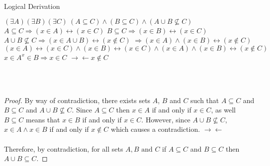 \documentclass[12pt]{article}
\newcommand{\contradiction}{$\rightarrow\leftarrow$}
\begin{document}
    Logical Derivation
                \begin{outline}
                    \1 $(\exists A)(\exists B)(\exists C)\ (A\subseteq C)\wedge (B\subseteq C)\wedge (A\cup B \not\subseteq C)$
                        \2 $A\subseteq C\Rightarrow (x\in A)\leftrightarrow(x\in C)$
                        \2 $B\subseteq C\Rightarrow (x\in B)\leftrightarrow(x\in C)$
                        \2 $A\cup B \not\subseteq C\Rightarrow (x\in A\cup B)\leftrightarrow(x\notin C)$
                            \3 $\Rightarrow (x\in A)\wedge (x\in B)\leftrightarrow(x\notin C)$
                    \1 $(x\in A)\leftrightarrow(x\in C) \wedge (x\in B)\leftrightarrow(x\in C) \wedge (x\in A)\wedge (x\in B)\leftrightarrow(x\notin C)$
                    \1 $x\in A ^ x\in B \Rightarrow x\in C$ \contradiction $x\notin C$
                \end{outline}
                \\\\
                \begin{proof}
                    By way of contradiction, there exists sets $A$, $B$ and $C$ such that $A\subseteq C$ and $B\subseteq C$ and $A\cup B \not\subseteq C$.
                    Since $A\subseteq C$ then $x\in A$ if and only if $x\in C$, as well $B\subseteq C$ means that $x\in B$ if and only if $x\in C$.
                    However, since $A\cup B\not\subseteq C$, $x\in A \wedge x\in B$ if and only if $x\notin C$ which causes a contradiction. \contradiction
                    \\\\
                    Therefore, by contradiction, for all sets $A, B \text{ and }C$ if $A\subseteq C$ and $B\subseteq C$ then $A\cup B\subseteq C$.
                \end{proof}
    \endsection
\end{document}

